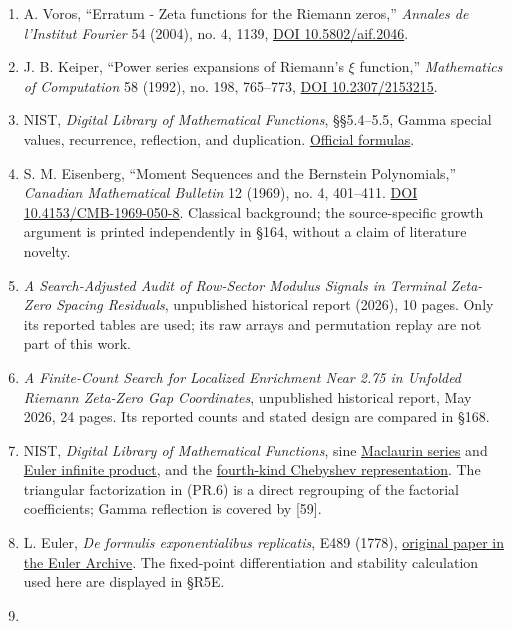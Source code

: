 \documentclass[
  11pt,
]{book}
\begin{document}
\begin{enumerate}
  supply the classical spectral-zeta formulas used here.
\item
  A. Voros, ``Erratum - Zeta functions for the Riemann zeros,''
  \emph{Annales de l'Institut Fourier} 54 (2004), no. 4, 1139,
  \href{https://aif.centre-mersenne.org/articles/10.5802/aif.2046/}{DOI
  10.5802/aif.2046}.
\item
  J. B. Keiper, ``Power series expansions of Riemann's \(\xi\)
  function,'' \emph{Mathematics of Computation} 58 (1992), no. 198,
  765--773, \href{https://doi.org/10.2307/2153215}{DOI 10.2307/2153215}.
\item
  NIST, \emph{Digital Library of Mathematical Functions}, §§5.4--5.5,
  Gamma special values, recurrence, reflection, and duplication.
  \href{https://dlmf.nist.gov/5.5}{Official formulas}.
\item
  S. M. Eisenberg, ``Moment Sequences and the Bernstein Polynomials,''
  \emph{Canadian Mathematical Bulletin} 12 (1969), no. 4, 401--411.
  \href{https://doi.org/10.4153/CMB-1969-050-8}{DOI
  10.4153/CMB-1969-050-8}. Classical background; the source-specific
  growth argument is printed independently in §164, without a claim of
  literature novelty.
\item
  \emph{A Search-Adjusted Audit of Row-Sector Modulus Signals in
  Terminal Zeta-Zero Spacing Residuals}, unpublished historical report
  (2026), 10 pages. Only its reported tables are used; its raw arrays
  and permutation replay are not part of this work.
\item
  \emph{A Finite-Count Search for Localized Enrichment Near 2.75 in
  Unfolded Riemann Zeta-Zero Gap Coordinates}, unpublished historical
  report, May 2026, 24 pages. Its reported counts and stated design are
  compared in §168.
\item
  NIST, \emph{Digital Library of Mathematical Functions}, sine
  \href{https://dlmf.nist.gov/4.19.E1}{Maclaurin series} and
  \href{https://dlmf.nist.gov/4.22.E1}{Euler infinite product}, and the
  \href{https://dlmf.nist.gov/18.5.E4}{fourth-kind Chebyshev
  representation}. The triangular factorization in (PR.6) is a direct
  regrouping of the factorial coefficients; Gamma reflection is covered
  by {[}59{]}.
\item
  L. Euler, \emph{De formulis exponentialibus replicatis}, E489 (1778),
  \href{https://scholarlycommons.pacific.edu/euler-works/489/}{original
  paper in the Euler Archive}. The fixed-point differentiation and
  stability calculation used here are displayed in §R5E.
\item

\end{enumerate}
\end{document}

